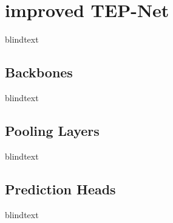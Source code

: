 \section{improved TEP-Net}
blindtext

\subsection{Backbones}
blindtext

\subsection{Pooling Layers}
blindtext

\subsection{Prediction Heads}
blindtext
